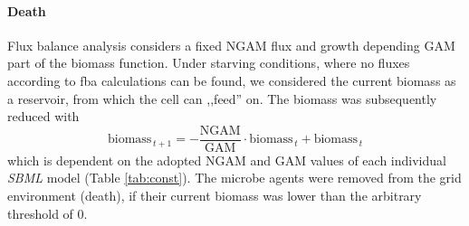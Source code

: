 \paragraph{Death}
Flux balance analysis considers a fixed NGAM flux and growth depending GAM part of the biomass function.
Under starving conditions, where no fluxes according to fba calculations can be found, we considered the current biomass as a reservoir, from which the cell can ,,feed'' on. The biomass was subsequently reduced with
\[
  \textrm{biomass}_{\,t+1} = -\frac{\textrm{NGAM}}{\textrm{GAM}}\cdot \textrm{biomass}_{\,t}+\textrm{biomass}_{\,t}
\]
which is dependent on the adopted NGAM and GAM values of each individual \textit{SBML} model (Table \hyperref[tab:const]{\ref{tab:const}}). The microbe agents were removed from the grid environment (death), if their current biomass was lower than the arbitrary threshold of 0.
